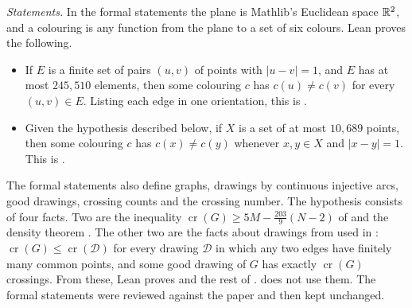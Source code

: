\documentclass[11pt,colorlinks]{charlie}
\newcommand{\cro}{\operatorname{cr}}
\begin{document}
\emph{Statements.} In the formal statements the plane is Mathlib's Euclidean space $\mathbb{R}^2$, and a colouring is any function from the plane to a set of six colours. Lean proves the following.
\begin{itemize}\small
\item If $E$ is a finite set of pairs $(u,v)$ of points with $|u-v|=1$, and $E$ has at most $245{,}510$ elements, then some colouring $c$ has $c(u)\ne c(v)$ for every $(u,v)\in E$. Listing each edge in one orientation, this is .
\item Given the hypothesis described below, if $X$ is a set of at most $10{,}689$ points, then some colouring $c$ has $c(x)\ne c(y)$ whenever $x,y\in X$ and $|x-y|=1$. This is .
\end{itemize}
The formal statements also define graphs, drawings by continuous injective arcs, good drawings, crossing counts and the crossing number. The hypothesis consists of four facts. Two are the inequality $\cro(G)\ge5M-\frac{203}9(N-2)$ of \cite[Theorem~4(b)]{BK} and the density theorem \cite[Theorem~7]{BFKP}. The other two are the facts about drawings from \cite{Schaefer} used in : $\cro(G)\le\cro(\mathcal D)$ for every drawing $\mathcal D$ in which any two edges have finitely many common points, and some good drawing of $G$ has exactly $\cro(G)$ crossings. From these, Lean proves  and the rest of .  does not use them. The formal statements were reviewed against the paper and then kept unchanged.
\end{document}
